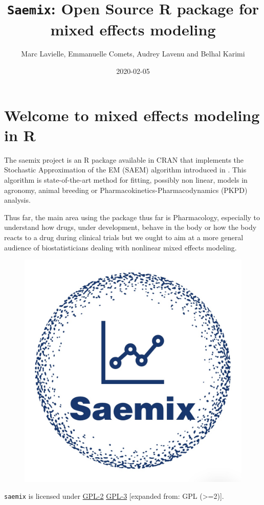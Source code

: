 \documentclass[]{book}
\title{\texttt{Saemix}: Open Source R package for mixed effects modeling}
\author{Marc Lavielle, Emmanuelle Comets, Audrey Lavenu and Belhal Karimi}
\date{2020-02-05}
\begin{document}
\maketitle

{
\hypersetup{linkcolor=black}
\setcounter{tocdepth}{1}
\tableofcontents
}
\chapter*{Welcome to mixed effects modeling in
R}\label{welcome-to-mixed-effects-modeling-in-r}

The saemix project is an R package \citep{saemix2017} available in CRAN
that implements the Stochastic Approximation of the EM (SAEM) algorithm
introduced in \citep{kuhn}. This algorithm is state-of-the-art method
for fitting, possibly non linear, models in agronomy, animal breeding or
Pharmacokinetics-Pharmacodynamics (PKPD) analysis.

Thus far, the main area using the package thus far is Pharmacology,
especially to understand how drugs, under development, behave in the
body or how the body reacts to a drug during clinical trials but we
ought to aim at a more general audience of biostatisticians dealing with
nonlinear mixed effects modeling.

\begin{figure}

{\centering \includegraphics[width=0.6\linewidth]{figures/logo1} 

}

\end{figure}

\texttt{saemix} is licensed under
\href{https://cran.r-project.org/web/licenses/GPL-2}{GPL-2} \textbar{}
\href{https://cran.r-project.org/web/licenses/GPL-3}{GPL-3} {[}expanded
from: GPL (\textgreater{}=2){]}.
\end{document}
